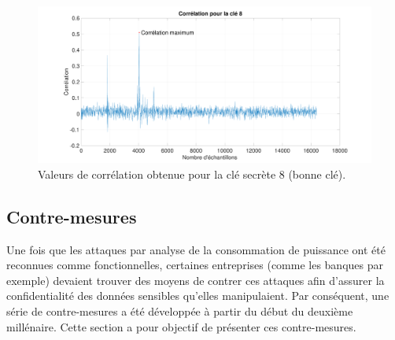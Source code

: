 \documentclass[10pt, oneside, a4paper]{article}
\begin{document}
\begin{figure}[htbp]
    \centering
    \includegraphics[scale=0.44, angle=90]{image/cle8}
    \caption{Valeurs de corrélation obtenue pour la clé secrète 8 (bonne clé).}
    \label{fig:cle8} 
\end{figure}

\newpage

\subsection{Contre-mesures}
\label{sec:contre-mesures}

\vspace{-0.2 cm}Une fois que les attaques par analyse de la consommation de puissance ont été reconnues comme fonctionnelles, certaines entreprises (comme les banques par exemple) devaient trouver des moyens de contrer ces attaques afin d'assurer la confidentialité des données sensibles qu'elles manipulaient. Par conséquent, une série de contre-mesures a été développée à partir du début du deuxième millénaire. Cette section a pour objectif de présenter ces contre-mesures. 
\end{document}
